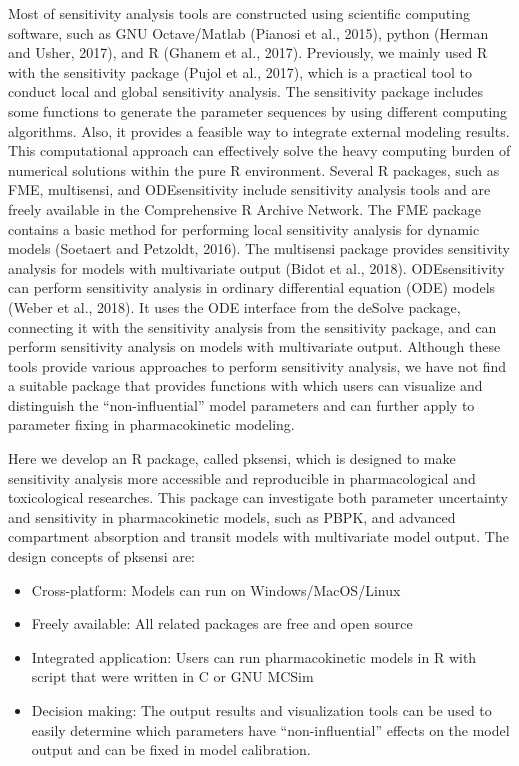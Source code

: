 \documentclass[article]{jss}
\providecommand{\tightlist}{%
  \setlength{\itemsep}{0pt}\setlength{\parskip}{0pt}}
\begin{document}
Most of sensitivity analysis tools are constructed using scientific
computing software, such as GNU Octave/Matlab (Pianosi et al., 2015),
python (Herman and Usher, 2017), and R (Ghanem et al., 2017).
Previously, we mainly used R with the sensitivity package (Pujol et al.,
2017), which is a practical tool to conduct local and global sensitivity
analysis. The sensitivity package includes some functions to generate
the parameter sequences by using different computing algorithms. Also,
it provides a feasible way to integrate external modeling results. This
computational approach can effectively solve the heavy computing burden
of numerical solutions within the pure R environment. Several R
packages, such as FME, multisensi, and ODEsensitivity include
sensitivity analysis tools and are freely available in the Comprehensive
R Archive Network. The FME package contains a basic method for
performing local sensitivity analysis for dynamic models (Soetaert and
Petzoldt, 2016). The multisensi package provides sensitivity analysis
for models with multivariate output (Bidot et al., 2018). ODEsensitivity
can perform sensitivity analysis in ordinary differential equation (ODE)
models (Weber et al., 2018). It uses the ODE interface from the deSolve
package, connecting it with the sensitivity analysis from the
sensitivity package, and can perform sensitivity analysis on models with
multivariate output. Although these tools provide various approaches to
perform sensitivity analysis, we have not find a suitable package that
provides functions with which users can visualize and distinguish the
``non-influential'' model parameters and can further apply to parameter
fixing in pharmacokinetic modeling.

Here we develop an R package, called pksensi, which is designed to make
sensitivity analysis more accessible and reproducible in pharmacological
and toxicological researches. This package can investigate both
parameter uncertainty and sensitivity in pharmacokinetic models, such as
PBPK, and advanced compartment absorption and transit models with
multivariate model output. The design concepts of pksensi are:

\begin{itemize}
\tightlist
\item
  Cross-platform: Models can run on Windows/MacOS/Linux
\item
  Freely available: All related packages are free and open source
\item
  Integrated application: Users can run pharmacokinetic models in R with
  script that were written in C or GNU MCSim
\item
  Decision making: The output results and visualization tools can be
  used to easily determine which parameters have ``non-influential''
  effects on the model output and can be fixed in model calibration.
\end{itemize}
\end{document}
